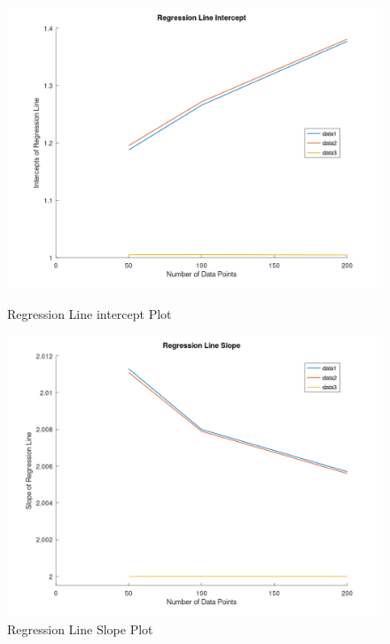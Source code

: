 \documentclass{article}
\begin{document}
\begin{figure}[htbp]
	\begin{minipage}[b]{0.5\linewidth}
		\centering
		\includegraphics[width=\linewidth]{Regression Line intercept Plot.png}
		\caption{Regression Line intercept Plot}
		\label{fig:chapter001_dist_001}
	\end{minipage}
	\hspace{0.5cm}
	\begin{minipage}[b]{0.5\linewidth}
		\centering
		\includegraphics[width=\linewidth]{Regression Line Slope Plot.png}
		\caption{Regression Line Slope Plot}
		\label{fig:chapter001_reward_001}
	\end{minipage}
\end{figure}
\end{document}
